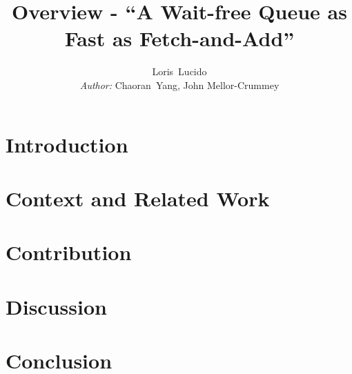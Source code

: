 \documentclass[10pt,journal,compsoc]{IEEEtran}
\begin{document}
\title{Overview - ``A Wait-free Queue as Fast as Fetch-and-Add''}

\author{Loris~Lucido\\\small{\textit{Author:} Chaoran~Yang,
        John Mellor-Crummey}}%


\maketitle

\IEEEdisplaynontitleabstractindextext
\IEEEpeerreviewmaketitle

\newcommand{\para}[1]{\textbf{\textit{#1}}\hspace{2 mm}}

\section{Introduction}\label{sec:introduction}


\section{Context and Related Work}\label{sec:context}


\section{Contribution}\label{sec:contribution}


\section{Discussion}\label{sec:discussion}


\section{Conclusion}\label{sec:conclusion}


\printbibliography
\end{document}
